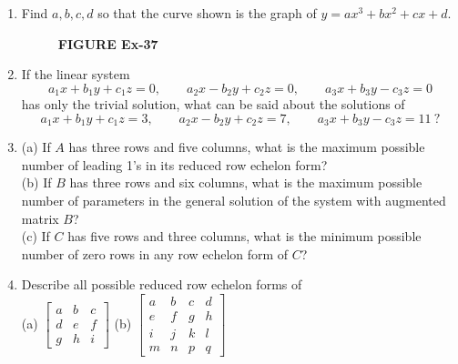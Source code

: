 \documentclass{article}
\theoremstyle{mystyle}
\begin{document}
\begin{enumerate}
    \item[37.] Find $a,b,c,d$ so that the curve shown is the graph of $y=ax^3+bx^2+cx+d$.
    \begin{figure}[h]
    \centering
    \caption*{\textbf{FIGURE Ex-37}}
    \end{figure}

    \item[39.] If the linear system
    \[
    a_1x+b_1y+c_1z=0,\qquad a_2x-b_2y+c_2z=0,\qquad a_3x+b_3y-c_3z=0
    \]
    has only the trivial solution, what can be said about the solutions of
    \[
    a_1x+b_1y+c_1z=3,\qquad a_2x-b_2y+c_2z=7,\qquad a_3x+b_3y-c_3z=11\ ?
    \]

    \item[40.] (a) If $A$ has three rows and five columns, what is the maximum possible number of leading 1's in its reduced row echelon form?\\
    (b) If $B$ has three rows and six columns, what is the maximum possible number of parameters in the general solution of the system with augmented matrix $B$?\\
    (c) If $C$ has five rows and three columns, what is the minimum possible number of zero rows in any row echelon form of $C$?

    \item[41.] Describe all possible reduced row echelon forms of\\
    (a) $\begin{bmatrix}a&b&c\\d&e&f\\g&h&i\end{bmatrix}$\qquad
    (b) $\begin{bmatrix}a&b&c&d\\e&f&g&h\\i&j&k&l\\m&n&p&q\end{bmatrix}$
\end{enumerate}
\end{document}
